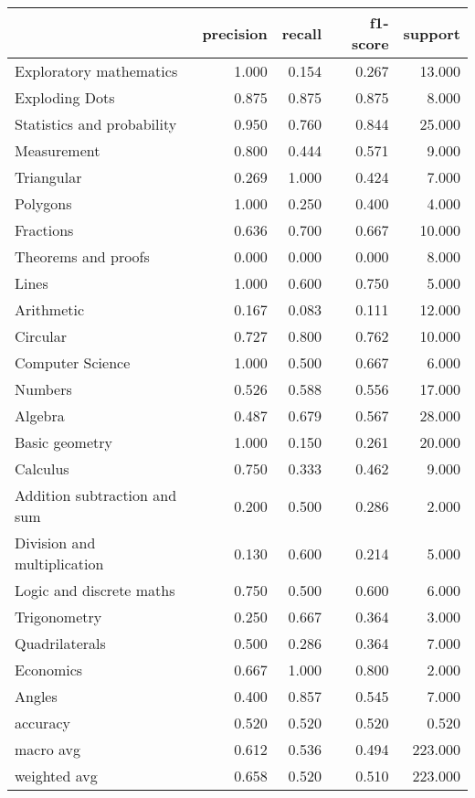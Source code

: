 \begin{tabular}{lrrrr}
\toprule
{} &  precision &  recall &  f1-score &  support \\
\midrule
Exploratory mathematics      &      1.000 &   0.154 &     0.267 &   13.000 \\
Exploding Dots               &      0.875 &   0.875 &     0.875 &    8.000 \\
Statistics and probability   &      0.950 &   0.760 &     0.844 &   25.000 \\
Measurement                  &      0.800 &   0.444 &     0.571 &    9.000 \\
Triangular                   &      0.269 &   1.000 &     0.424 &    7.000 \\
Polygons                     &      1.000 &   0.250 &     0.400 &    4.000 \\
Fractions                    &      0.636 &   0.700 &     0.667 &   10.000 \\
Theorems and proofs          &      0.000 &   0.000 &     0.000 &    8.000 \\
Lines                        &      1.000 &   0.600 &     0.750 &    5.000 \\
Arithmetic                   &      0.167 &   0.083 &     0.111 &   12.000 \\
Circular                     &      0.727 &   0.800 &     0.762 &   10.000 \\
Computer Science             &      1.000 &   0.500 &     0.667 &    6.000 \\
Numbers                      &      0.526 &   0.588 &     0.556 &   17.000 \\
Algebra                      &      0.487 &   0.679 &     0.567 &   28.000 \\
Basic geometry               &      1.000 &   0.150 &     0.261 &   20.000 \\
Calculus                     &      0.750 &   0.333 &     0.462 &    9.000 \\
Addition subtraction and sum &      0.200 &   0.500 &     0.286 &    2.000 \\
Division and multiplication  &      0.130 &   0.600 &     0.214 &    5.000 \\
Logic and discrete maths     &      0.750 &   0.500 &     0.600 &    6.000 \\
Trigonometry                 &      0.250 &   0.667 &     0.364 &    3.000 \\
Quadrilaterals               &      0.500 &   0.286 &     0.364 &    7.000 \\
Economics                    &      0.667 &   1.000 &     0.800 &    2.000 \\
Angles                       &      0.400 &   0.857 &     0.545 &    7.000 \\
accuracy                     &      0.520 &   0.520 &     0.520 &    0.520 \\
macro avg                    &      0.612 &   0.536 &     0.494 &  223.000 \\
weighted avg                 &      0.658 &   0.520 &     0.510 &  223.000 \\
\bottomrule
\end{tabular}
